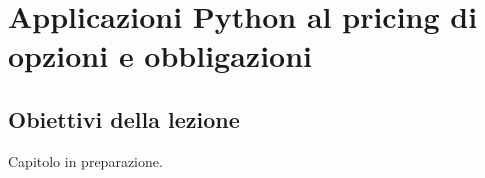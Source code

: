
\chapter{Applicazioni Python al pricing di opzioni e obbligazioni}

\section{Obiettivi della lezione}

Capitolo in preparazione.

